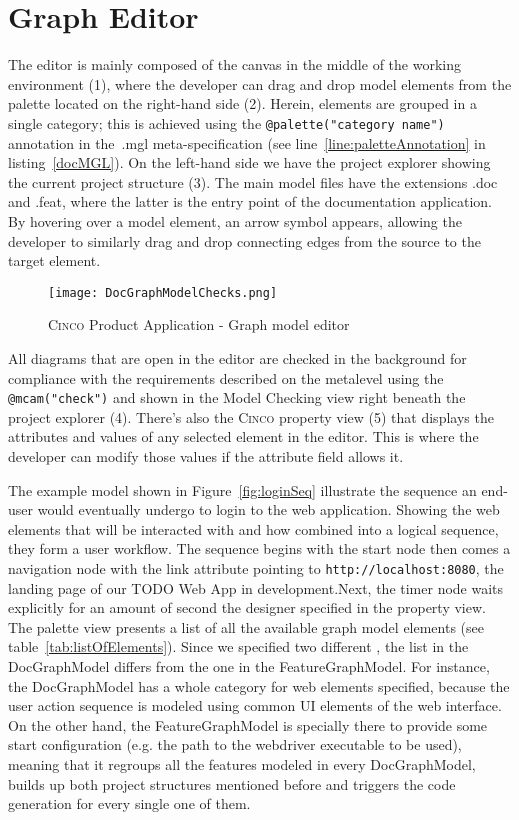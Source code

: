 \section{Graph Editor}\label{sec:graphEditor}

The editor is mainly composed of the canvas in the middle of the working environment (1), where the developer can drag and drop model elements from the palette located on the right-hand side (2). Herein, elements are grouped in a single category; this is achieved using the \lstinline[language=MGL]{@palette("category name")} annotation in the~.mgl meta-specification (see line~\ref{line:paletteAnnotation} in listing~\ref{docMGL}). On the left-hand side we have the project explorer showing the current project structure (3). The main model files have the extensions .doc and .feat, where the latter is the entry point of the documentation application. By hovering over a model element, an arrow symbol appears, allowing the developer to similarly drag and drop connecting edges from the source to the target element. 

\begin{figure}[h]
    \centering
    \texttt{[image: DocGraphModelChecks.png]}
    \caption{\textsc{Cinco} Product Application - Graph model editor}\label{fig:graphDSL}
\end{figure}

All diagrams that are open in the editor are checked in the background for compliance with the requirements described on the metalevel using the \lstinline[language=MGL]{@mcam("check")} and shown in the Model Checking view right beneath the project explorer (4). There's also the \textsc{Cinco} property view (5) that displays the attributes and values of any selected element in the editor. This is where the developer can modify those values if the attribute field allows it.

The example model shown in Figure~\ref{fig:loginSeq} illustrate the sequence an end-user would eventually undergo to login to the web application. Showing the web elements that will be interacted with and how combined into a logical sequence, they form a user workflow. The sequence begins with the start node then comes a navigation node with the link attribute pointing to \lstinline{http://localhost:8080}, the landing page of our TODO Web App in development.Next, the timer node waits explicitly for an amount of second the designer specified in the property view. The palette view presents a list of all the available graph model elements (see table~\ref{tab:listOfElements}). Since we specified two different , the list in the DocGraphModel differs from the one in the FeatureGraphModel. For instance, the DocGraphModel has a whole category for web elements specified, because the user action sequence is modeled using common UI elements of the web interface. On the other hand, the FeatureGraphModel is specially there to provide some start configuration (e.g. the path to the webdriver executable to be used), meaning that it regroups all the features modeled in every DocGraphModel, builds up both project structures mentioned before and triggers the code generation for every single one of them.

